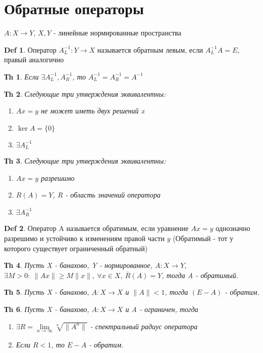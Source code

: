 \documentclass[14pt]{article}
\theoremstyle{plain}
\newtheorem{Thm}{Тh}
\theoremstyle{definition}
\newtheorem{Def}{Def}
\begin{document}
 	\section{Обратные операторы}
 		$A : X \to Y$, $X,Y$ - линейные нормированные пространства
 		\begin{Def}
 			Оператор $A_{L}^{-1}: Y \to X$ называется обратным левым, если $A_{L}^{-1} A = E$, правый аналогично
 		\end{Def}
 		\begin{Thm}
 			Если $\exists A_{L}^{-1},  A_{R}^{-1}$, то $ A_{L}^{-1} = A_{R}^{-1} = A^{-1}$
 		\end{Thm}
 		\begin{Thm}
 			Следующие три утверждения эквивалентны:
 			\begin{enumerate}
 				\item $Ax = y$ не может иметь двух решений x
 				\item $\ker{A} = \{0\}$
 				\item $\exists A_{L}^{-1}$
 			\end{enumerate}		
 		\end{Thm}
 		\begin{Thm}
 			Следующие три утверждения эквивалентны:
 			\begin{enumerate}
 				\item $Ax = y$ разрешимо
 				\item $R(A) = Y$, R - область значений оператора
 				\item $\exists A_{R}^{-1}$
 			\end{enumerate}		
 		\end{Thm}
 		\begin{Def}
 			Оператор A называется обратимым, если уравнение $Ax = y$ однозначно разрешимо и устойчиво к изменениям правой части $y$ (Обратимый - тот у которого существует ограниченный обратный)
 		\end{Def}
 		\begin{Thm}
 			Пусть X - банахово, Y - нормированное, $A: X \to Y$, $\exists M > 0: \ \|Ax\| \geq M\|x\|,\ \forall x \in X$, $\overline{R}(A) = Y$, тогда A - обратимый.
 		\end{Thm}
 		\begin{Thm}
 			Пусть X - банахово, $A:X\to X$ и $\|A\| < 1$, тогда $(E-A)$  - обратим. 
 		\end{Thm}
 		\begin{Thm}
 			Пусть X - банахово, $A:X \to X$	и A - ограничен, тогда
 			\begin{enumerate}
 				\item $\exists R = \lim\limits_{n\to\infty} \sqrt[n]{\|A^n\|}$ - спектральный радиус оператора
 				\item Если $R < 1$, то $E-A$ - обратим. 
 			\end{enumerate}		
 		\end{Thm}
\end{document}

